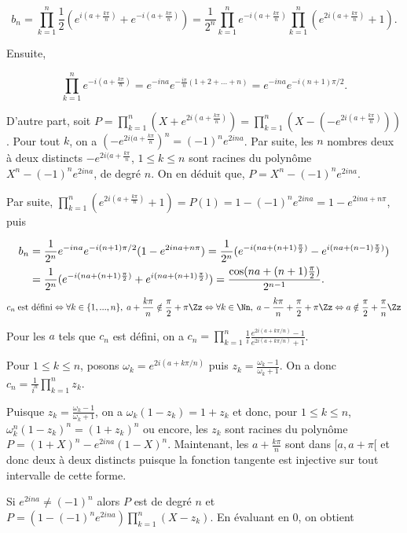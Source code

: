 {{$$b_n=\prod_{k=1}^{n}\frac{1}{2}(e^{i(a+\frac{k\pi}{n})}+e^{-i(a+\frac{k\pi}{n})})=\frac{1}{2^n}\prod_{k=1}^{n}e^{-i(a+\frac{k\pi}{n})}\prod_{k=1}^{n}(e^{2i(a+\frac{k\pi}{n})}+1).$$

Ensuite, 

$$\prod_{k=1}^{n}e^{-i(a+\frac{k\pi}{n})}=e^{-ina}e^{-\frac{i\pi}{n}(1+2+...+n)}=e^{-ina}e^{-i(n+1)\pi/2}.$$

D'autre part, soit $P=\prod_{k=1}^{n}(X+e^{2i(a+\frac{k\pi}{n})})=\prod_{k=1}^{n}(X-(-e^{2i(a+\frac{k\pi}{n})}))$.
Pour tout $k$, on a $(-e^{2i(a+\frac{k\pi}{n}})^n=(-1)^ne^{2ina}$. Par suite, les $n$ nombres deux à deux distincts $-e^{2i(a+\frac{k\pi}{n}}$, $1\leq k\leq n$ sont racines du polynôme $X^n-(-1)^ne^{2ina}$, de degré $n$. On en déduit que, $P=X^n-(-1)^ne^{2ina}$.

Par suite, $\prod_{k=1}^{n}(e^{2i(a+\frac{k\pi}{n})}+1)=P(1)=1-(-1)^ne^{2ina}=1-e^{2ina+n\pi}$, puis 

\begin{align*}\ensuremath
b_n&=\frac{1}{2^n}e^{-ina}e^{-i(n+1)\pi/2}(1-e^{2ina+n\pi})=\frac{1}{2^n}(e^{-i(na+(n+1)\frac{\pi}{2})}-e^{i(na+(n-1)\frac{\pi}{2})})\\
 &=\frac{1}{2^n}(e^{-i(na+(n+1)\frac{\pi}{2})}+e^{i(na+(n+1)\frac{\pi}{2})})=\frac{\cos(na+(n+1)\frac{\pi}{2})}{2^{n-1}}.
\end{align*}
\begin{align*}\ensuremath
c_n\;\mbox{est défini}\Leftrightarrow\forall k\in\{1,...,n\},\;a+\frac{k\pi}{n}\notin\frac{\pi}{2}+\pi\Zz\Leftrightarrow\forall k\in\Nn,\;a-\frac{k\pi}{n}+\frac{\pi}{2}+\pi\Zz\Leftrightarrow a\notin\frac{\pi}{2}+\frac{\pi}{n}\Zz
\end{align*}

Pour les $a$ tels que $c_n$ est défini, on a $c_n=\prod_{k=1}^{n}\frac{1}{i}\frac{e^{2i(a+k\pi/n)}-1}{e^{2i(a+k\pi/n)}+1}$.

Pour $1\leq k\leq n$, posons $\omega_k=e^{2i(a+k\pi/n)}$ puis $z_k=\frac{\omega_k-1}{\omega_k+1}$. On a donc $c_n=\frac{1}{i^n}\prod_{k=1}^{n}z_k$.

Puisque $z_k=\frac{\omega_k-1}{\omega_k+1}$, on a $\omega_k(1-z_k)=1+z_k$ et donc, pour $1\leq k\leq n$, $\omega_k^n(1-z_k)^n=(1+z_k)^n$ ou encore, les $z_k$ sont racines du polynôme $P=(1+X)^n-e^{2ina}(1-X)^n$. Maintenant, les $a+\frac{k\pi}{n}$ sont dans $[a,a+\pi[$ et donc deux à deux distincts puisque la fonction tangente est injective sur tout intervalle de cette forme.

\begin{itemize}
[1er cas.] Si $e^{2ina}\neq(-1)^n$ alors $P$ est de degré $n$ et $P=(1-(-1)^ne^{2ina})\prod_{k=1}^{n}(X-z_k)$. En évaluant en $0$, on obtient


\end{itemize}}}
